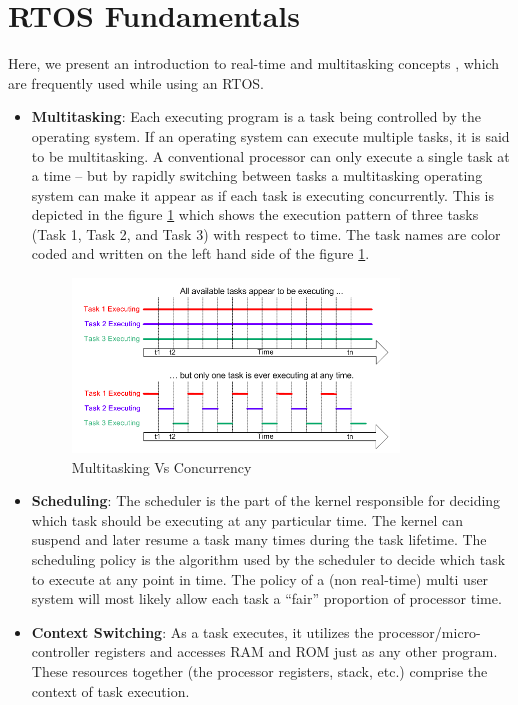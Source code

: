 \documentclass[12pt]{report}
\begin{document}
\section{RTOS Fundamentals}
 Here, we present an introduction to real-time and multitasking concepts \cite{rtos-funda}, which are frequently used while using an RTOS.
 \begin{itemize}
     \item \textbf{Multitasking}: Each executing program is a task being controlled by the operating system. If an operating system can execute multiple tasks, it is said to be multitasking. A conventional processor can only execute a single task at a time -- but by rapidly switching between tasks a multitasking operating system can make it appear as if each task is executing concurrently. This is depicted in the figure \ref{fig:multitasking} which shows the execution pattern of three tasks (Task 1, Task 2, and Task 3) with respect to time. The task names are color coded and written on the left hand side of the figure \ref{fig:multitasking}.
     \begin{figure}[h]
    \centering
    \includegraphics[width=0.82\textwidth]{images/multitasking.png}
    \caption{Multitasking Vs Concurrency}
    \label{fig:multitasking}
    \end{figure}
     \item \textbf{Scheduling}: The scheduler is the part of the kernel responsible for deciding which task should be executing at any particular time. The kernel can suspend and later resume a task many times during the task lifetime. The scheduling policy is the algorithm used by the scheduler to decide which task to execute at any point in time. The policy of a (non real-time) multi user system will most likely allow each task a ``fair” proportion of processor time. 
     \item \textbf{Context Switching}: As a task executes, it utilizes the processor/micro-controller registers and accesses RAM and ROM just as any other program. These resources together (the processor registers, stack, etc.) comprise the context of task execution. 
     

\end{itemize}
\end{document}
